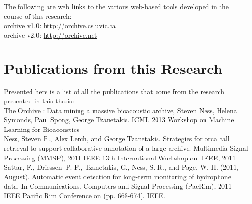 \documentclass[12pt,oneside]{book}
\begin{document}
	\appendix


\label{chap:weblinks}

The following are web links to the various web-based tools developed
in the course of this research:\\

orchive v1.0: \url{http://orchive.cs.uvic.ca}\\

orchive v2.0: \url{http://orchive.net}\\



\label{chap:publications}

\section{Publications from this Research}

Presented here is a list of all the publications that come from the
research presented in this thesis:
\\

\cite{ness2013orchive}
The Orchive : Data mining a massive bioacoustic archive, Steven Ness,
Helena Symonds, Paul Spong, George Tzanetakis. ICML 2013 Workshop on
Machine Learning for Bioacoustics
\\

\cite{ness2011strategies}
Ness, Steven R., Alex Lerch, and George Tzanetakis. Strategies for
orca call retrieval to support collaborative annotation of a large
archive. Multimedia Signal Processing (MMSP), 2011 IEEE 13th
International Workshop on. IEEE, 2011.  
\\

\cite{sattar2011automatic}
Sattar, F., Driessen, P. F., Tzanetakis, G., Ness, S. R., and Page,
W. H. (2011, August). Automatic event detection for long-term
monitoring of hydrophone data. In Communications, Computers and Signal
Processing (PacRim), 2011 IEEE Pacific Rim Conference on
(pp. 668-674). IEEE.
\\
\end{document}
